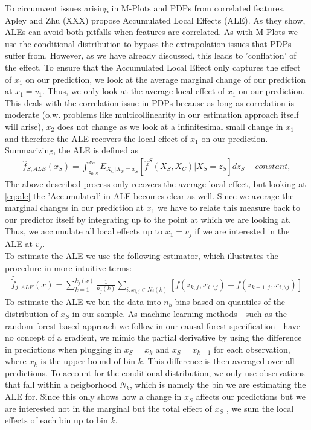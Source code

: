 To circumvent issues arising in M-Plots and PDPs from correlated features, Apley and Zhu (XXX) propose Accumulated Local Effects (ALE). As they show, ALEs can avoid both pitfalls when features are correlated. As with M-Plots we use the conditional distribution to bypass the extrapolation issues that PDPs suffer from. However, as we have already discussed, this leads to 'conflation' of the effect. To ensure that the Accumulated Local Effect only captures the effect of $x_1$ on our prediction, we look at the average marginal change of our prediction at $x_1=v_1$. Thus, we only look at the average local effect of $x_1$ on our prediction. This deals with the correlation issue in PDPs because as long as correlation is moderate (o.w. problems like multicollinearity in our estimation approach itself will arise), $x_2$ does not change as we look at a infinitesimal small change in $x_1$ and therefore the ALE recovers the local effect of $x_1$ on our prediction. Summarizing, the ALE is defined as 
\begin{align}
\hat{f}_{S, ALE} (x_S)=\int_{z_{0, S}}^{x_S} E_{X_C|X_S=x_S}[\hat{f}^S(X_S, X_C)|X_S=z_S]dz_S - constant, \label{eq:ale}
\end{align}
The above described process only recovers the average local effect, but looking at \ref{eq:ale} the 'Accumulated' in ALE becomes clear as well. Since we average the marginal changes in our prediction at $x_1$ we have to relate this measure back to our predictor itself by integrating up to the point at which we are looking at. Thus, we accumulate all local effects up to $x_1=v_j$ if we are interested in the ALE at $v_j$. \\
To estimate the ALE we use the following estimator, which illustrates the procedure in more intuitive terms: 
\begin{align}
\hat{\tilde{f}}_{j, ALE}(x)=\sum_{k=1}^{k_j(x)} \frac{1}{n_j(k)}\sum_{i:x_{i,j}\in N_j(k)}[f(z_{k,j}, x_{i,\setminus j})-f(z_{k-1,j}, x_{i,\setminus j})] \label{eq:ale_estim}
\end{align}
To estimate the ALE we bin the data into $n_b$ bins based on quantiles of the distribution of $x_S$ in our sample. As machine learning methods - such as the random forest based approach we follow in our causal forest specification - have no concept of a gradient, we mimic the partial derivative by using the difference in predictions when plugging in $x_S=x_k$ and $x_S=x_{k-1}$  for each observation, where $x_k$ is the upper bound of bin $k$. This difference is then averaged over all predictions. To account for the conditional distribution, we only use observations that fall within a neigborhood $N_k$, which is namely the bin we are estimating the ALE for. Since this only shows how a change in $x_S$ affects our predictions but we are interested not in the marginal but the total effect of $x_S$ , we sum the local effects of each bin up to bin $k$. \\

